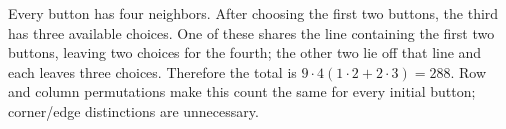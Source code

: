 Every button has four neighbors. After choosing the first two buttons, the third has three available choices. One of these shares the line containing the first two buttons, leaving two choices for the fourth; the other two lie off that line and each leaves three choices. Therefore the total is $9\cdot4(1\cdot2+2\cdot3)=\boxed{288}$. Row and column permutations make this count the same for every initial button; corner/edge distinctions are unnecessary.
